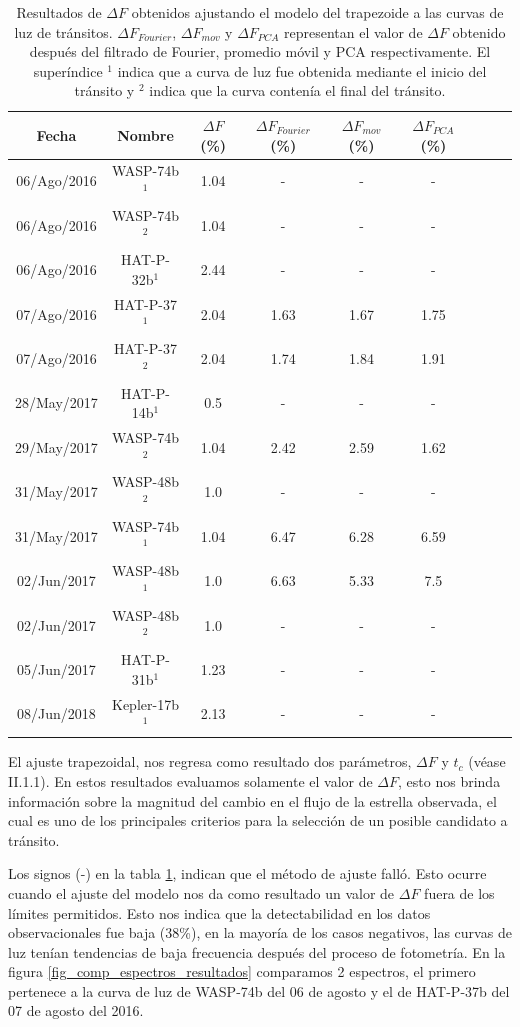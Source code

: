 \begin{table}
	\centering
	\begin{tabular}{ccccccccc}
	\hline 
	Fecha & Nombre & $\Delta F$ (\%) & $\Delta F_{Fourier}$ (\%) &  $\Delta F_{mov}$ (\%) & $\Delta F_{PCA}$ (\%) \\ 
	\hline
	06/Ago/2016 & WASP-74b$^{1}$ & 1.04 & - & - & - \\ 
	06/Ago/2016 & WASP-74b$^{2}$ & 1.04 & - & - & - \\
	06/Ago/2016 & HAT-P-32b$^{1}$ & 2.44 & - & - & - \\
	07/Ago/2016 & HAT-P-37$^{1}$ & 2.04 & 1.63 & 1.67 & 1.75 \\ 
	07/Ago/2016 & HAT-P-37$^{2}$ & 2.04 & 1.74 & 1.84 & 1.91 \\ 
	28/May/2017 & HAT-P-14b$^{1}$ & 0.5 & - & - & - \\ 
	29/May/2017 & WASP-74b$^{2}$ & 1.04 & 2.42 & 2.59 & 1.62 \\ 
	31/May/2017 & WASP-48b$^{2}$ & 1.0 & - & - & - \\  
	31/May/2017 & WASP-74b$^{1}$ & 1.04 & 6.47 & 6.28 & 6.59 \\
	02/Jun/2017 & WASP-48b$^{1}$ & 1.0 & 6.63 & 5.33 & 7.5 \\
	02/Jun/2017 & WASP-48b$^{2}$ & 1.0 & - & - & - \\
	05/Jun/2017 & HAT-P-31b$^{1}$ & 1.23 & - & - & - \\
	08/Jun/2018 & Kepler-17b$^{1}$ & 2.13 & - & - & - \\ 
	\hline 
	\end{tabular} 
	\caption{Resultados de $\Delta F$ obtenidos ajustando el modelo del trapezoide a las curvas de luz de tránsitos. $\Delta F_{Fourier}$, $\Delta F_{mov}$ y $\Delta F_{PCA}$ representan el valor de $\Delta F$ obtenido después del filtrado de Fourier, promedio móvil y PCA respectivamente. El superíndice $^{1}$ indica que a curva de luz fue obtenida mediante el inicio del tránsito y $^{2}$ indica que la curva contenía el final del tránsito.}
	\label{tab_resultados_profundidad}
	\end{table}

El ajuste trapezoidal, nos regresa como resultado dos parámetros, $\Delta F$ y $t_{c}$ (véase II.1.1). En estos resultados evaluamos solamente el valor de $\Delta F$, esto nos brinda información sobre la magnitud del cambio en el flujo de la estrella observada, el cual es uno de los principales criterios para la selección de un posible candidato a tránsito. 

Los signos (-) en la tabla \ref{tab_resultados_profundidad}, indican que el método de ajuste falló. Esto ocurre cuando el ajuste del modelo nos da como resultado un valor de $\Delta F$ fuera de los límites permitidos. Esto nos indica que la detectabilidad en los datos observacionales fue baja (38\%), en la mayoría de los casos negativos, las curvas de luz tenían tendencias de baja frecuencia después del proceso de fotometría. En la figura \ref{fig_comp_espectros_resultados} comparamos 2 espectros, el primero pertenece a la curva de luz de WASP-74b del 06 de agosto y el de HAT-P-37b del 07 de agosto del 2016.

